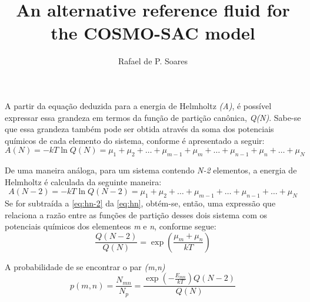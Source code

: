 \documentclass[3p]{elsarticle}
\begin{document}
\begin{frontmatter} 
\title{An alternative reference fluid for the COSMO-SAC model}
\author{Rafael de P. Soares}

\address{Departamento de Engenharia Qu\'imica, Escola de
Engenharia, Universidade Federal do Rio Grande do Sul,
Rua Engenheiro Luis Englert, s/n, Bairro Farroupilha, CEP 90040-040, Porto
Alegre, RS, Brazil\\July 2013}


\end{frontmatter}

A partir da equação deduzida para a energia de Helmholtz \emph{(A)},  é possível
expressar essa grandeza em termos da função de partição canônica, \emph{Q(N)}.
Sabe-se que essa grandeza também pode ser obtida através da soma dos potenciais
químicos de cada elemento do sistema, conforme é apresentado a seguir:
\begin{equation}\label{eq:hn}
A(N) = -kT\ln Q(N) = \mu_1 + \mu_2 + \ldots+ \mu_{m-1} + \mu_m + \ldots
+ \mu_{n-1} + \mu_{n} + \ldots + \mu_N
\end{equation}

De uma maneira análoga, para um sistema contendo \emph{N-2} elementos, a energia
de Helmholtz é calculada da seguinte maneira:
\begin{equation}\label{eq:hn-2}
A(N-2) = -kT\ln Q(N-2) = \mu_1 + \mu_2 + \ldots+ \mu_{m-1} + \ldots
+ \mu_{n-1} + \ldots + \mu_N
\end{equation}
Se for subtraída a \autoref{eq:hn-2} da \autoref{eq:hn}, obtém-se, então, uma
expressão que relaciona a razão entre as funções de partição desses dois
sistema com os potenciais químicos dos elementeos \emph{m} e \emph{n}, conforme
segue:
\begin{equation}
\frac{Q(N-2)}{Q(N)} = \exp\left(\frac{\mu_m + \mu_n}{kT}\right)
\end{equation}

A probabilidade de se encontrar o par \emph{(m,n)}
\begin{equation}
p(m,n) = \frac{N_{mn}}{N_p} =
\displaystyle\frac{\exp\left(-\displaystyle\frac{E_{mn}}{kT}\right)Q(N-2)}{Q(N)}
\end{equation}
\end{document}
